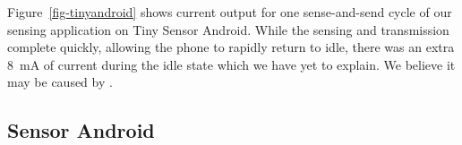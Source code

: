 Figure~\ref{fig-tinyandroid} shows current output for one sense-and-send
cycle of our sensing application on Tiny Sensor Android. While the sensing
and transmission complete quickly, allowing the phone to rapidly return to
idle, there was an extra 8~mA of current during the idle state which we have
yet to explain. We believe it may be caused by .

\subsection{Sensor Android}

